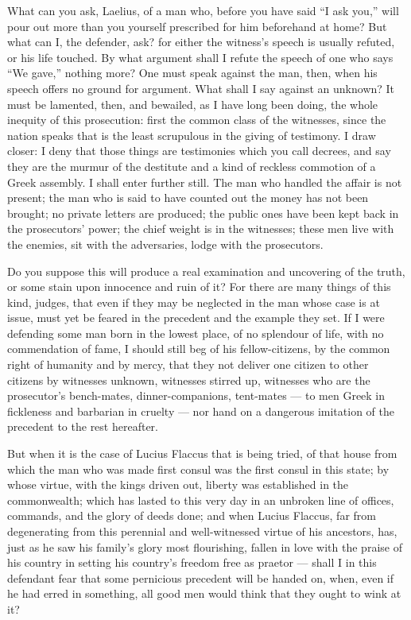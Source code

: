  What can you ask, Laelius, of a man who, before you have said ``I ask you,'' will pour out more than you yourself prescribed for him beforehand at home? But what can I, the defender, ask? for either the witness's speech is usually refuted, or his life touched. By what argument shall I refute the speech of one who says ``We gave,'' nothing more? One must speak against the man, then, when his speech offers no ground for argument. What shall I say against an unknown? It must be lamented, then, and bewailed, as I have long been doing, the whole inequity of this prosecution: first the common class of the witnesses, since the nation speaks that is the least scrupulous in the giving of testimony. I draw closer: I deny that those things are testimonies which you call decrees, and say they are the murmur of the destitute and a kind of reckless commotion of a Greek assembly. I shall enter further still. The man who handled the affair is not present; the man who is said to have counted out the money has not been brought; no private letters are produced; the public ones have been kept back in the prosecutors' power; the chief weight is in the witnesses; these men live with the enemies, sit with the adversaries, lodge with the prosecutors.

 Do you suppose this will produce a real examination and uncovering of the truth, or some stain upon innocence and ruin of it? For there are many things of this kind, judges, that even if they may be neglected in the man whose case is at issue, must yet be feared in the precedent and the example they set. If I were defending some man born in the lowest place, of no splendour of life, with no commendation of fame, I should still beg of his fellow-citizens, by the common right of humanity and by mercy, that they not deliver one citizen to other citizens by witnesses unknown, witnesses stirred up, witnesses who are the prosecutor's bench-mates, dinner-companions, tent-mates --- to men Greek in fickleness and barbarian in cruelty --- nor hand on a dangerous imitation of the precedent to the rest hereafter.

 But when it is the case of Lucius Flaccus that is being tried, of that house from which the man who was made first consul was the first consul in this state; by whose virtue, with the kings driven out, liberty was established in the commonwealth; which has lasted to this very day in an unbroken line of offices, commands, and the glory of deeds done; and when Lucius Flaccus, far from degenerating from this perennial and well-witnessed virtue of his ancestors, has, just as he saw his family's glory most flourishing, fallen in love with the praise of his country in setting his country's freedom free as praetor --- shall I in this defendant fear that some pernicious precedent will be handed on, when, even if he had erred in something, all good men would think that they ought to wink at it?

